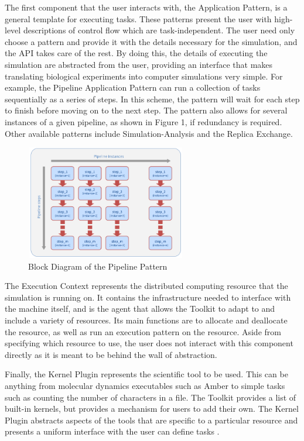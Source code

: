 \documentclass[]{article}
\begin{document}
			The first component that the user interacts with, the Application Pattern, is a general template for executing tasks. These patterns present the user with high-level descriptions of control flow which are task-independent. The user need only choose a pattern and provide it with the details necessary for the simulation, and the API takes care of the rest. By doing this, the details of executing the simulation are abstracted from the user, providing an interface that makes translating biological experiments into computer simulations very simple. For example, the Pipeline Application Pattern can run a collection of tasks sequentially as a series of steps. In this scheme, the pattern will wait for each step to finish before moving on to the next step. The pattern also allows for several instances of a given pipeline, as shown in Figure 1, if redundancy is required. Other available patterns include Simulation-Analysis and the Replica Exchange.

			\begin{figure}[H]
				\centering
				\includegraphics[width=7cm,height=5cm]{diagrams/pipeline_pattern}
				\caption{Block Diagram of the Pipeline Pattern \cite{pipeline_pattern}}
				\label{fig:pipeline_block_diagram}
			\end{figure}

			The Execution Context represents the distributed computing resource that the simulation is running on. It contains the infrastructure needed to interface with the machine itself, and is the agent that allows the Toolkit to adapt to and include a variety of resources. Its main functions are to allocate and deallocate the resource, as well as run an execution pattern on the resource. Aside from specifying which resource to use, the user does not interact with this component directly as it is meant to be behind the wall of abstraction. 

			Finally, the Kernel Plugin represents the scientific tool to be used. This can be anything from molecular dynamics executables such as Amber to simple tasks such as counting the number of characters in a file. The Toolkit provides a list of built-in kernels, but provides a mechanism for users to add their own. The Kernel Plugin abstracts aspects of the tools that are specific to a particular resource and presents a uniform interface with the user can define tasks \cite{enmd_paper}.
\end{document}
